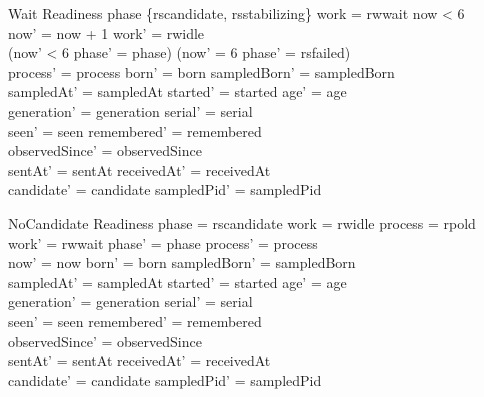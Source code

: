 \documentclass[a4paper,10pt,fleqn]{article}
\begin{document}
\begin{schema}{Wait}
  \Delta Readiness
\where
  phase \in \{rscandidate, rsstabilizing\} \land work = rwwait \land now < 6 \\
  now' = now + 1 \land work' = rwidle \\
  (now' < 6 \land phase' = phase) \lor
    (now' = 6 \land phase' = rsfailed) \\
  process' = process \land born' = born \land sampledBorn' = sampledBorn \\
  sampledAt' = sampledAt \land started' = started \land age' = age \\
  generation' = generation \land serial' = serial \\
  seen' = seen \land remembered' = remembered \\
  observedSince' = observedSince \\
  sentAt' = sentAt \land receivedAt' = receivedAt \\
  candidate' = candidate \land sampledPid' = sampledPid
\end{schema}
\begin{schema}{NoCandidate}
  \Delta Readiness
\where
  phase = rscandidate \land work = rwidle \land process = rpold \\
  work' = rwwait \land phase' = phase \land process' = process \\
  now' = now \land born' = born \land sampledBorn' = sampledBorn \\
  sampledAt' = sampledAt \land started' = started \land age' = age \\
  generation' = generation \land serial' = serial \\
  seen' = seen \land remembered' = remembered \\
  observedSince' = observedSince \\
  sentAt' = sentAt \land receivedAt' = receivedAt \\
  candidate' = candidate \land sampledPid' = sampledPid
\end{schema}
\end{document}
